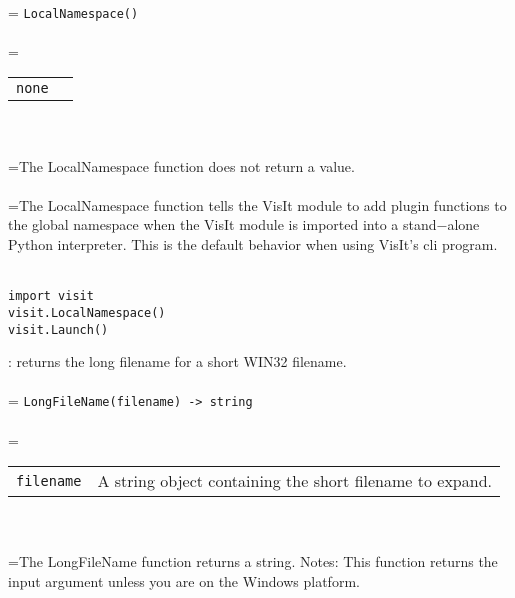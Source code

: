 \documentclass[10pt,a4paper]{report}
\begin{document}
 \\ 
\hangindent=\parindent 
\verb!LocalNamespace()!\\ [-3mm]

 \\ 
\hangindent=\parindent 
\begin{tabular}{ll}
\verb!none! &  \\
\end{tabular} \\[-2mm]


 \\ 
\hangindent=\parindent The LocalNamespace function does not return a value. \\[-3mm] 

 \\ 
\hangindent=\parindent The LocalNamespace function tells the VisIt module to add plugin functions to the global namespace when the VisIt module is imported into a stand$-$alone Python interpreter. This is the default behavior when using VisIt's cli program. \\[-3mm] 

\\[-6mm]
\begin{verbatim}import visit
visit.LocalNamespace()
visit.Launch()
\end{verbatim}
\newpage


{}
: returns the long filename for a short WIN32 filename.\\[-3mm]

 \\ 
\hangindent=\parindent 
\verb!LongFileName(filename) -> string!\\ [-3mm]

 \\ 
\hangindent=\parindent 
\begin{tabular}{lp{9cm}}
\verb!filename! & A string object containing the short filename to expand. \\
\end{tabular} \\[-2mm]


 \\ 
\hangindent=\parindent The LongFileName function returns a string. Notes: This function returns the input argument unless you are on the Windows platform. \\[-3mm] 
\end{document}
